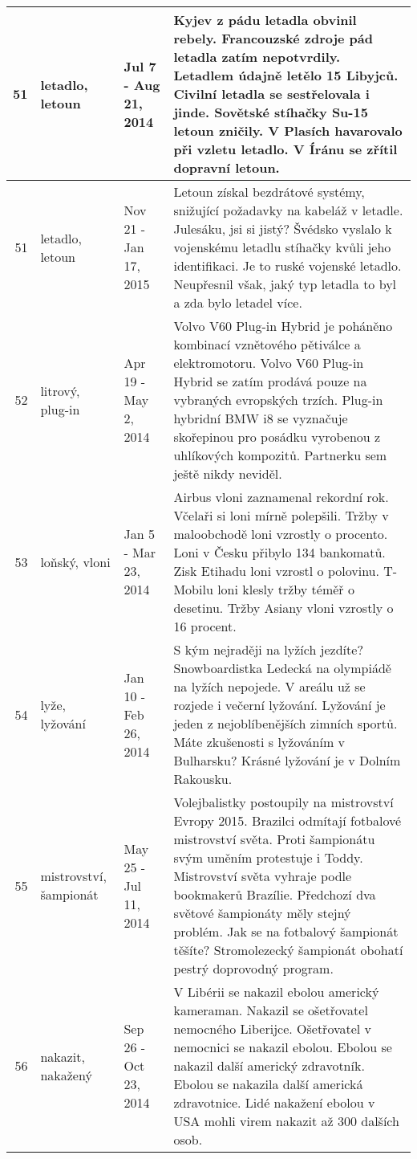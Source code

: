 \begin{tabularx}{\linewidth}{r m{2.5cm} X m{8cm}}
51 & letadlo, letoun & Jul 7 - Aug 21, 2014 & Kyjev z pádu letadla obvinil rebely. Francouzské zdroje pád letadla zatím nepotvrdily. Letadlem údajně letělo 15 Libyjců. Civilní letadla se sestřelovala i jinde. Sovětské stíhačky Su-15 letoun zničily. V Plasích havarovalo při vzletu letadlo. V Íránu se zřítil dopravní letoun. \\ \midrule
51 & letadlo, letoun & Nov 21 - Jan 17, 2015 & Letoun získal bezdrátové systémy, snižující požadavky na kabeláž v letadle. Julesáku, jsi si jistý? Švédsko vyslalo k vojenskému letadlu stíhačky kvůli jeho identifikaci. Je to ruské vojenské letadlo. Neupřesnil však, jaký typ letadla to byl a zda bylo letadel více. \\ \midrule
52 & litrový, plug-in & Apr 19 - May 2, 2014 & Volvo V60 Plug-in Hybrid je poháněno kombinací vznětového pětiválce a elektromotoru. Volvo V60 Plug-in Hybrid se zatím prodává pouze na vybraných evropských trzích. Plug-in hybridní BMW i8 se vyznačuje skořepinou pro posádku vyrobenou z uhlíkových kompozitů. Partnerku sem ještě nikdy neviděl. \\ \midrule
53 & loňský, vloni & Jan 5 - Mar 23, 2014 & Airbus vloni zaznamenal rekordní rok. Včelaři si loni mírně polepšili. Tržby v maloobchodě loni vzrostly o procento. Loni v Česku přibylo 134 bankomatů. Zisk Etihadu loni vzrostl o polovinu. T-Mobilu loni klesly tržby téměř o desetinu. Tržby Asiany vloni vzrostly o 16 procent. \\ \midrule
54 & lyže, lyžování & Jan 10 - Feb 26, 2014 & S kým nejraději na lyžích jezdíte? Snowboardistka Ledecká na olympiádě na lyžích nepojede. V areálu už se rozjede i večerní lyžování. Lyžování je jeden z nejoblíbenějších zimních sportů. Máte zkušenosti s lyžováním v Bulharsku? Krásné lyžování je v Dolním Rakousku. \\ \midrule
55 & mistrovství, šampionát & May 25 - Jul 11, 2014 & Volejbalistky postoupily na mistrovství Evropy 2015. Brazilci odmítají fotbalové mistrovství světa. Proti šampionátu svým uměním protestuje i Toddy. Mistrovství světa vyhraje podle bookmakerů Brazílie. Předchozí dva světové šampionáty měly stejný problém. Jak se na fotbalový šampionát těšíte? Stromolezecký šampionát obohatí pestrý doprovodný program. \\ \midrule
56 & nakazit, nakažený & Sep 26 - Oct 23, 2014 & V Libérii se nakazil ebolou americký kameraman. Nakazil se ošetřovatel nemocného Liberijce. Ošetřovatel v nemocnici se nakazil ebolou. Ebolou se nakazil další americký zdravotník. Ebolou se nakazila další americká zdravotnice. Lidé nakažení ebolou v USA mohli virem nakazit až 300 dalších osob. \\ \midrule

\end{tabularx}
